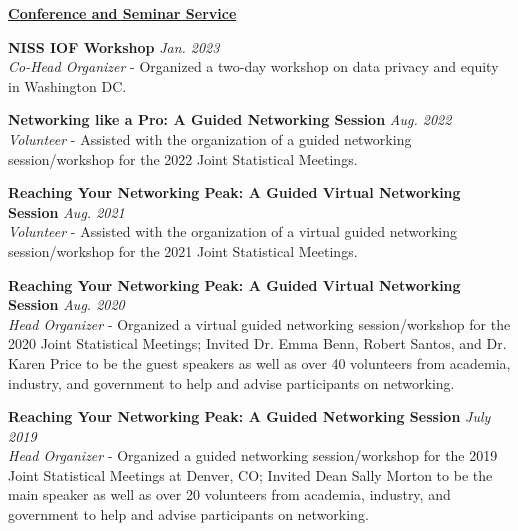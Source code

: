 \professionalspace
\underline{\textbf{\large Conference and Seminar Service}}\normalsize

\outreachspace
\textbf{NISS IOF Workshop} \hfill \textit{Jan. 2023}\\
\textit{Co-Head Organizer} - Organized a two-day workshop on data privacy and equity in Washington DC.

\outreachspace
\textbf{Networking like a Pro: A Guided Networking Session} \hfill \textit{Aug. 2022}\\
\textit{Volunteer} - Assisted with the organization of a guided networking session/workshop for the 2022 Joint Statistical Meetings.

\outreachspace
\textbf{Reaching Your Networking Peak: A Guided Virtual Networking Session} \hfill \textit{Aug. 2021}\\
\textit{Volunteer} - Assisted with the organization of a virtual guided networking session/workshop for the 2021 Joint Statistical Meetings.

\outreachspace
\textbf{Reaching Your Networking Peak: A Guided Virtual Networking Session} \hfill \textit{Aug. 2020}\\
\textit{Head Organizer} - Organized a virtual guided networking session/workshop for the 2020 Joint Statistical Meetings; Invited Dr. Emma Benn, Robert Santos, and Dr. Karen Price to be the guest speakers as well as over 40 volunteers from academia, industry, and government to help and advise participants on networking.

\outreachspace
{}

\outreachspace
\textbf{Reaching Your Networking Peak: A Guided Networking Session} \hfill \textit{July 2019}\\
\textit{Head Organizer} - Organized a guided networking session/workshop for the 2019 Joint Statistical Meetings at Denver, CO; Invited Dean Sally Morton to be the main speaker as well as over 20 volunteers from academia, industry, and government to help and advise participants on networking.

